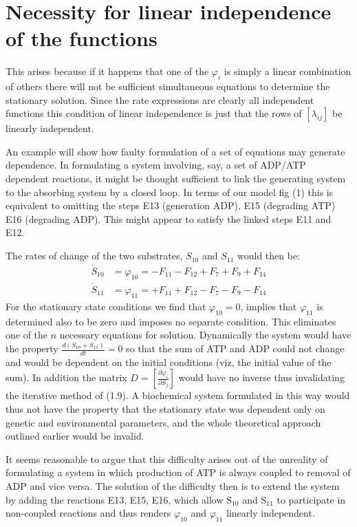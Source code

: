\section{Necessity for linear independence of the functions}

This arises because if it happens that one of the $\varphi_i$ is simply a linear combination of others there will not be sufficient simultaneous equations to determine the stationary solution. Since the rate expressions are clearly all independent functions this condition of linear independence is just that the rows of $\left[\lambda_{ij}\right]$ be linearly independent.

An example will show how faulty formulation of a set of equations may generate dependence. In formulating a system involving, say, a set of ADP/ATP dependent reactions, it might be thought sufficient to link the generating system to the absorbing system by a closed loop. In terms of our model fig (1) this is equivalent to omitting the steps E13 (generation ADP), E15 (degrading ATP) E16 (degrading ADP). This might appear to satisfy the linked steps E11 and E12.

The rates of change of the two substrates, $S_{10}$ and $S_{11}$ would then be:
%
$$
\begin{aligned}
\dot{S}_{10} &= \varphi_{10}=-F_{11}-F_{12}+F_7+F_9+F_{14} \\
\dot{S}_{11} &= \varphi_{11}=+F_{11}+F_{12} - F_7-F_9-F_{14}
\end{aligned}
$$
%
For the stationary state conditions we find that $\varphi_{10}=0$, implies that $\varphi_{11}$ is determined also to be zero and imposes no separate condition. This eliminates one of the $n$ necessary equations for solution. Dynamically the system would have the property $\frac{d\left(S_{10}+S_{11}\right)}{dt}=0$ so that the sum of ATP and ADP could not change and would be dependent on the initial conditions (viz, the initial value of the sum). In addition the matrix $D=\left[\frac{\partial \varphi_{i}}{\partial S_{j}}\right]$ would have no inverse thus invalidating the iterative method of (1.9). A biochemical system formulated in this way would thus not have the property that the stationary state was dependent only on genetic and environmental parameters, and the whole theoretical approach outlined earlier would be invalid.

It seems reasonable to argue that this difficulty arises out of the unreality of formulating a system in which production of ATP is always coupled to removal of ADP and vice versa. The solution of the difficulty then is to extend the system by adding the reactions E13, E15, E16, which allow $\mathrm{S}_{10}$ and $\mathrm{S}_{11}$ to participate in non-coupled reactions and thus renders $\varphi_{10}$ and $\varphi_{11}$ linearly independent.

